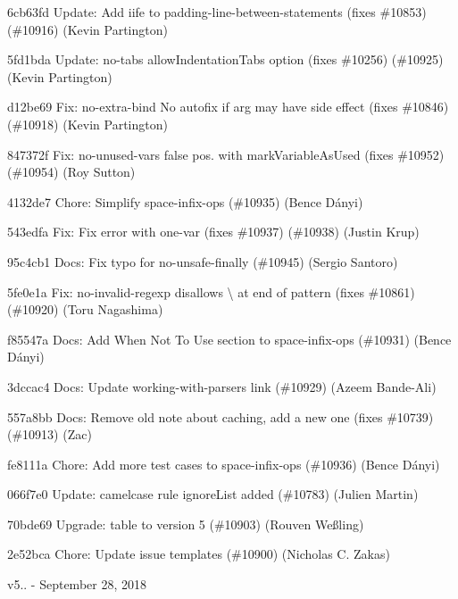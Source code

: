 \begin{DoxyItemize}
\item 6cb63fd Update\+: Add iife to padding-\/line-\/between-\/statements (fixes \#10853) (\#10916) (Kevin Partington)
\item 5fd1bda Update\+: no-\/tabs allow\+Indentation\+Tabs option (fixes \#10256) (\#10925) (Kevin Partington)
\item d12be69 Fix\+: no-\/extra-\/bind No autofix if arg may have side effect (fixes \#10846) (\#10918) (Kevin Partington)
\item 847372f Fix\+: no-\/unused-\/vars false pos. with mark\+Variable\+As\+Used (fixes \#10952) (\#10954) (Roy Sutton)
\item 4132de7 Chore\+: Simplify space-\/infix-\/ops (\#10935) (Bence Dányi)
\item 543edfa Fix\+: Fix error with one-\/var (fixes \#10937) (\#10938) (Justin Krup)
\item 95c4cb1 Docs\+: Fix typo for no-\/unsafe-\/finally (\#10945) (Sergio Santoro)
\item 5fe0e1a Fix\+: no-\/invalid-\/regexp disallows \textbackslash{} at end of pattern (fixes \#10861) (\#10920) (Toru Nagashima)
\item f85547a Docs\+: Add \textquotesingle{}When Not To Use\textquotesingle{} section to space-\/infix-\/ops (\#10931) (Bence Dányi)
\item 3dccac4 Docs\+: Update working-\/with-\/parsers link (\#10929) (Azeem Bande-\/\+Ali)
\item 557a8bb Docs\+: Remove old note about caching, add a new one (fixes \#10739) (\#10913) (Zac)
\item fe8111a Chore\+: Add more test cases to space-\/infix-\/ops (\#10936) (Bence Dányi)
\item 066f7e0 Update\+: camelcase rule ignore\+List added (\#10783) (Julien Martin)
\item 70bde69 Upgrade\+: table to version 5 (\#10903) (Rouven Weßling)
\item 2e52bca Chore\+: Update issue templates (\#10900) (Nicholas C. Zakas)
\end{DoxyItemize}

v5.. -\/ September 28, 2018


